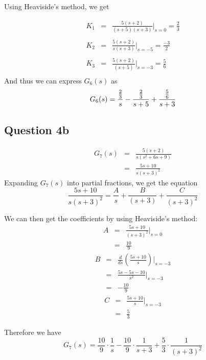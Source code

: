\documentclass[12pt, a4paper]{article}
\begin{document}
		\noindent Using Heaviside's method, we get

		\begin{equation*}
			\begin{array}{rcl}
				K_1 & = & \frac{5(s+2)}{(s+5)(s+3)} \bigg\rvert_{s=0} = \frac{2}{3}\\
				\\
				K_2 & = & \frac{5(s+2)}{s(s+3)} \bigg\rvert_{s=-5} = \frac{-3}{2} \\
				\\
				K_3 & = & \frac{5(s+2)}{(s+5)} \bigg\rvert_{s=-3} = \frac{5}{6} \\
			\end{array}
		\end{equation*}
		And thus we can express $G_6(s)$ as
		\[
			G_6(s) = \frac{\frac{2}{3}}{s} - \frac{\frac{2}{3}}{s+5} + \frac{\frac{5}{6}}{s+3}\\
		\]

	\subsection*{Question 4b}
		\label{sub:question_4b}
		\[
			\begin{array}{rcl}
				G_7(s) & = & \frac{5(s+2)}{s(s^2 + 6s + 9)}\\
				& = & \frac{5s+10}{s(s+3)^2}
			\end{array}
		\]
		\noindent Expanding $G_7(s)$ into partial fractions, we get the equation
		\[
			\frac{5s+10}{s(s+3)^2} = \frac{A}{s} + \frac{B}{(s+3)} + \frac{C}{(s+3)^2}
		\]

		\noindent We can then get the coefficients by using Heaviside's method:
		\[
			\begin{array}{rcl}
				A & = & \frac{5s + 10}{(s+3)^2}\bigg\rvert_{s=0}\\
				& = & \frac{10}{9}
			\end{array}
		\]
		\[
			\begin{array}{rcl}
				B & = & \frac{d}{ds}\left(\frac{5s + 10}{s}\right)\bigg\rvert_{s=-3}\\
				& = & \frac{5s - 5s - 10}{s^2}\bigg\rvert_{s=-3}\\
				& = & -\frac{10}{9}
			\end{array}
		\]
		\[
			\begin{array}{rcl}
				C & = & \frac{5s + 10}{s}\bigg\rvert_{s=-3} \\
				& = & \frac{5}{3}
			\end{array}
		\]

		\noindent Therefore we have
		\[
			G_7(s) = \frac{10}{9} \cdot \frac{1}{s} - \frac{10}{9} \cdot \frac{1}{s+3} + \frac{5}{3} \cdot \frac{1}{(s+3)^2}
		\]
\end{document}
